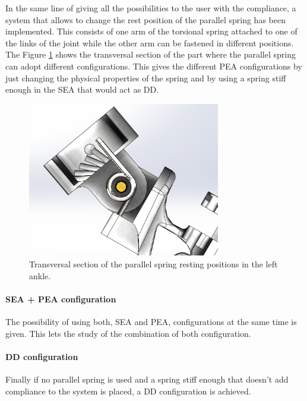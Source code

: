 In the same line of giving all the possibilities to the user with the compliance, a system that allows to change the rest position of the parallel spring has been implemented.
This consists of one arm of the torsional spring attached to one of the links of the joint while the other arm can be fastened in different positions.
The Figure \ref{fig:rotational_spring_rest_position} shows the transversal section of the part where the parallel spring can adopt different configurations. 
This gives the different PEA configurations by just changing the physical properties of the spring and by using a spring stiff enough in the SEA that would act as DD.

\begin{figure}[ht!]
  \centering
  \includegraphics[width=0.75\textwidth]{figures/rotational_spring_rest_positions}
  \caption{Transversal section of the parallel spring resting positions in the left ankle.}
  \label{fig:rotational_spring_rest_position}
\end{figure}

\paragraph{SEA + PEA configuration} %
\label{ssub:sea_pea_configuration}
The possibility of using both, SEA and PEA, configurations at the same time is given.
This lets the study of the combination of both configuration.

\paragraph{DD configuration } %
\label{ssub:dd_configuration}
Finally if no parallel spring is used and a spring stiff enough that doesn't add compliance to the system is placed, a DD configuration is achieved.


